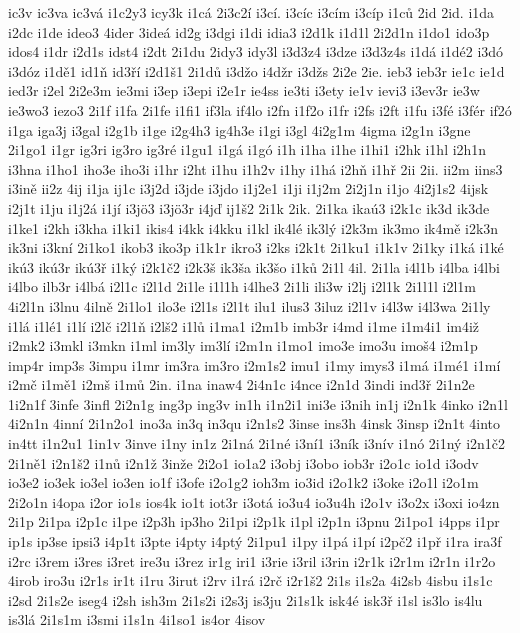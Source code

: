ic3v
ic3va
ic3vá
i1c2y3
icy3k
i1cá
2i3c2í
i3cí.
i3cíc
i3cím
i3cíp
i1ců
2id
2id.
i1da
i2dc
i1de
ideo3
4ider
3ideá
id2g
i3dgi
i1di
idia3
i2d1k
i1d1l
2i2d1n
i1do1
ido3p
idos4
i1dr
i2d1s
idst4
i2dt
2i1du
2idy3
idy3l
i3d3z4
i3dze
i3d3z4s
i1dá
i1dé2
i3dó
i3dóz
i1dě1
id1ň
id3ří
i2d1š1
2i1dů
i3džo
i4džr
i3džs
2i2e
2ie.
ieb3
ieb3r
ie1c
ie1d
ied3r
i2el
2i2e3m
ie3mi
i3ep
i3epi
i2e1r
ie4ss
ie3ti
i3ety
ie1v
ievi3
i3ev3r
ie3w
ie3wo3
iezo3
2i1f
i1fa
2i1fe
i1fi1
if3la
if4lo
i2fn
i1f2o
i1fr
i2fs
i2ft
i1fu
i3fé
i3fér
if2ó
i1ga
iga3j
i3gal
i2g1b
i1ge
i2g4h3
ig4h3e
i1gi
i3gl
4i2g1m
4igma
i2g1n
i3gne
2i1go1
i1gr
ig3ri
ig3ro
ig3ré
i1gu1
i1gá
i1gó
i1h
i1ha
i1he
i1hi1
i2hk
i1hl
i2h1n
i3hna
i1ho1
iho3e
iho3i
i1hr
i2ht
i1hu
i1h2v
i1hy
i1há
i2hň
i1hř
2ii
2ii.
ii2m
iins3
i3ině
ii2z
4ij
i1ja
ij1c
i3j2d
i3jde
i3jdo
i1j2e1
i1ji
i1j2m
2i2j1n
i1jo
4i2j1s2
4ijsk
i2j1t
i1ju
i1j2á
i1jí
i3jö3
i3jö3r
i4jď
ij1š2
2i1k
2ik.
2i1ka
ikaú3
i2k1c
ik3d
ik3de
i1ke1
i2kh
i3kha
i1ki1
ikis4
i4kk
i4kku
i1kl
ik4lé
ik3lý
i2k3m
ik3mo
ik4mě
i2k3n
ik3ni
i3kní
2i1ko1
ikob3
iko3p
i1k1r
ikro3
i2ks
i2k1t
2i1ku1
i1k1v
2i1ky
i1ká
i1ké
ikú3
ikú3r
ikú3ř
i1ký
i2k1č2
i2k3š
ik3ša
ik3šo
i1ků
2i1l
4il.
2i1la
i4l1b
i4lba
i4lbi
i4lbo
ilb3r
i4lbá
i2l1c
i2l1d
2i1le
i1l1h
i4lhe3
2i1li
ili3w
i2lj
i2l1k
2i1l1l
i2l1m
4i2l1n
i3lnu
4ilně
2i1lo1
ilo3e
i2l1s
i2l1t
ilu1
ilus3
3iluz
i2l1v
i4l3w
i4l3wa
2i1ly
i1lá
i1lé1
i1lí
i2lč
i2l1ň
i2lš2
i1lů
i1ma1
i2m1b
imb3r
i4md
i1me
i1m4i1
im4iž
i2mk2
i3mkl
i3mkn
i1ml
im3ly
im3lí
i2m1n
i1mo1
imo3e
imo3u
imoš4
i2m1p
imp4r
imp3s
3impu
i1mr
im3ra
im3ro
i2m1s2
imu1
i1my
imys3
i1má
i1mé1
i1mí
i2mč
i1mě1
i2mš
i1mů
2in.
i1na
inaw4
2i4n1c
i4nce
i2n1d
3indi
ind3ř
2i1n2e
1i2n1f
3infe
3infl
2i2n1g
ing3p
ing3v
in1h
i1n2i1
ini3e
i3nih
in1j
i2n1k
4inko
i2n1l
4i2n1n
4inní
2i1n2o1
ino3a
in3q
in3qu
i2n1s2
3inse
ins3h
4insk
3insp
i2n1t
4into
in4tt
i1n2u1
1in1v
3inve
i1ny
in1z
2i1ná
2i1né
i3ní1
i3ník
i3nív
i1nó
2i1ný
i2n1č2
2i1ně1
i2n1š2
i1nů
i2n1ž
3inže
2i2o1
io1a2
i3obj
i3obo
iob3r
i2o1c
io1d
i3odv
io3e2
io3ek
io3el
io3en
io1f
i3ofe
i2o1g2
ioh3m
io3id
i2o1k2
i3oke
i2o1l
i2o1m
2i2o1n
i4opa
i2or
io1s
ios4k
io1t
iot3r
i3otá
io3u4
io3u4h
i2o1v
i3o2x
i3oxi
io4zn
2i1p
2i1pa
i2p1c
i1pe
i2p3h
ip3ho
2i1pi
i2p1k
i1pl
i2p1n
i3pnu
2i1po1
i4pps
i1pr
ip1s
ip3se
ipsi3
i4p1t
i3pte
i4pty
i4ptý
2i1pu1
i1py
i1pá
i1pí
i2pč2
i1př
i1ra
ira3f
i2rc
i3rem
i3res
i3ret
ire3u
i3rez
ir1g
iri1
i3rie
i3ril
i3rin
i2r1k
i2r1m
i2r1n
i1r2o
4irob
iro3u
i2r1s
ir1t
i1ru
3irut
i2rv
i1rá
i2rč
i2r1š2
2i1s
i1s2a
4i2sb
4isbu
i1s1c
i2sd
2i1s2e
iseg4
i2sh
ish3m
2i1s2i
i2s3j
is3ju
2i1s1k
isk4é
isk3ř
i1sl
is3lo
is4lu
is3lá
2i1s1m
i3smi
i1s1n
4i1so1
is4or
4isov
